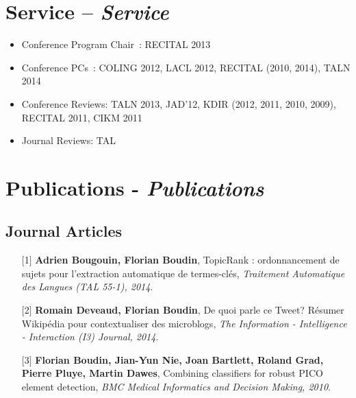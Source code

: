 \documentclass[11pt,a4paper]{moderncv}
\begin{document}
\section{Service – \textit{Service}}

\begin{itemize}[leftmargin=0.5cm,itemsep=-0.1cm]
    \item Conference Program Chair~: RECITAL 2013
    \item Conference PCs~: COLING 2012, LACL 2012, RECITAL (2010, 2014), TALN 2014
    \item Conference Reviews: TALN 2013, JAD'12, KDIR (2012, 2011, 2010, 2009), RECITAL 2011, CIKM 2011
    \item Journal Reviews: TAL
\end{itemize}

\section{Publications - \textit{Publications}}

\setlength{\hintscolumnwidth}{0cm}

    \subsection{Journal Articles}
    \begin{itemize}[leftmargin=1.2cm,itemsep=0.1cm]
        \item[{\small$[$1$]$}] \textbf{Adrien Bougouin, Florian Boudin}, TopicRank : ordonnancement de sujets pour l’extraction automatique de termes-clés, \textit{Traitement Automatique des Langues (TAL 55-1), 2014}.
        \item[{\small$[$2$]$}] \textbf{Romain Deveaud, Florian Boudin}, De quoi parle ce Tweet? Résumer Wikipédia pour contextualiser des microblogs, \textit{The Information - Intelligence - Interaction (I3) Journal, 2014}.
        \item[{\small$[$3$]$}] \textbf{Florian Boudin, Jian-Yun Nie, Joan Bartlett, Roland Grad, Pierre Pluye, Martin Dawes}, Combining classifiers for robust PICO element detection, \textit{BMC Medical Informatics and Decision Making, 2010}.
    \end{itemize}
\end{document}
